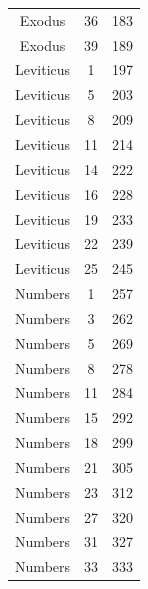 \documentclass{article}
\newlength{\minipageheight}
\newlength{\minipagewidth}
\begin{document}
\begin{minipage}[l][\minipageheight][t]{\minipagewidth}
\begin{center}
\begin{tabular}{|c|c|c|}
            Exodus    & 36      & 183      \\
            Exodus    & 39      & 189      \\
            Leviticus & 1       & 197      \\
            Leviticus & 5       & 203      \\
            Leviticus & 8       & 209      \\
            Leviticus & 11      & 214      \\
            Leviticus & 14      & 222      \\
            Leviticus & 16      & 228      \\
            Leviticus & 19      & 233      \\
            Leviticus & 22      & 239      \\
            Leviticus & 25      & 245      \\
            Numbers   & 1       & 257      \\
            Numbers   & 3       & 262      \\
            Numbers   & 5       & 269      \\
            Numbers   & 8       & 278      \\
            Numbers   & 11      & 284      \\
            Numbers   & 15      & 292      \\
            Numbers   & 18      & 299      \\
            Numbers   & 21      & 305      \\
            Numbers   & 23      & 312      \\
            Numbers   & 27      & 320      \\
            Numbers   & 31      & 327      \\
            Numbers   & 33      & 333      \\
            \hline
        \end{tabular}
    \end{center}
\end{minipage}%
%
%
\end{document}
